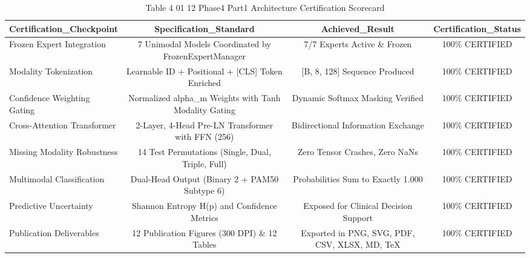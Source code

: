 \begin{table}[htbp]
\centering
\small
\begin{tabular}{lccc}
\hline
Certification\_Checkpoint & Specification\_Standard & Achieved\_Result & Certification\_Status \\
\hline
Frozen Expert Integration & 7 Unimodal Models Coordinated by FrozenExpertManager & 7/7 Experts Active \& Frozen & 100\% CERTIFIED \\
Modality Tokenization & Learnable ID + Positional + [CLS] Token Enriched & [B, 8, 128] Sequence Produced & 100\% CERTIFIED \\
Confidence Weighting Gating & Normalized alpha\_m Weights with Tanh Modality Gating & Dynamic Softmax Masking Verified & 100\% CERTIFIED \\
Cross-Attention Transformer & 2-Layer, 4-Head Pre-LN Transformer with FFN (256) & Bidirectional Information Exchange & 100\% CERTIFIED \\
Missing Modality Robustness & 14 Test Permutations (Single, Dual, Triple, Full) & Zero Tensor Crashes, Zero NaNs & 100\% CERTIFIED \\
Multimodal Classification & Dual-Head Output (Binary 2 + PAM50 Subtype 6) & Probabilities Sum to Exactly 1.000 & 100\% CERTIFIED \\
Predictive Uncertainty & Shannon Entropy H(p) and Confidence Metrics & Exposed for Clinical Decision Support & 100\% CERTIFIED \\
Publication Deliverables & 12 Publication Figures (300 DPI) \& 12 Tables & Exported in PNG, SVG, PDF, CSV, XLSX, MD, TeX & 100\% CERTIFIED \\
\hline
\end{tabular}
\caption{Table 4 01 12 Phase4 Part1 Architecture Certification Scorecard}
\label{tab:table_4_01_12_phase4_part1_architecture_certification_scorecard}
\end{table}
